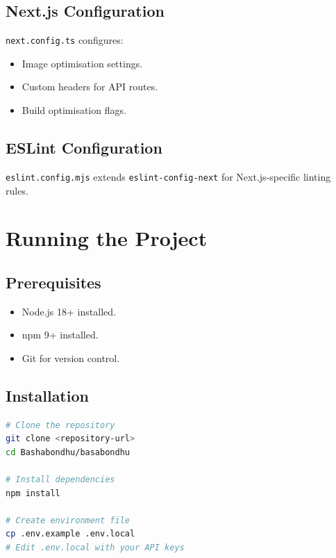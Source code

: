 \documentclass[12pt, a4paper, oneside]{report}
\newcommand{\filepath}[1]{\texttt{\small\color{codeblue}#1}}
\begin{document}
\section{Next.js Configuration}

\filepath{next.config.ts} configures:
\begin{itemize}[leftmargin=2em]
  \item Image optimisation settings.
  \item Custom headers for API routes.
  \item Build optimisation flags.
\end{itemize}

\section{ESLint Configuration}

\filepath{eslint.config.mjs} extends \texttt{eslint-config-next} for Next.js-specific linting rules.


\chapter{Running the Project}

\section{Prerequisites}

\begin{itemize}[leftmargin=2em]
  \item Node.js 18+ installed.
  \item npm 9+ installed.
  \item Git for version control.
\end{itemize}

\section{Installation}

\begin{lstlisting}[language=bash, caption={Installation Commands}]
# Clone the repository
git clone <repository-url>
cd Bashabondhu/basabondhu

# Install dependencies
npm install

# Create environment file
cp .env.example .env.local
# Edit .env.local with your API keys
\end{lstlisting}
\end{document}
